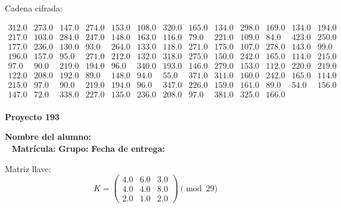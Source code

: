 \documentclass[12pt]{article}
\begin{document}
Cadena cifrada:
\begin{center}
$\begin{array}{lllllllllllll}
312.0 & 273.0 & 147.0 & 274.0 & 153.0 & 108.0 & 320.0 & 165.0 & 134.0 & 298.0 & 169.0 & 134.0 & 194.0\\
217.0 & 103.0 & 284.0 & 247.0 & 148.0 & 163.0 & 116.0 & 79.0 & 221.0 & 109.0 & 84.0 & 423.0 & 250.0\\
177.0 & 236.0 & 130.0 & 93.0 & 264.0 & 133.0 & 118.0 & 271.0 & 175.0 & 107.0 & 278.0 & 143.0 & 99.0\\
196.0 & 157.0 & 95.0 & 271.0 & 212.0 & 132.0 & 318.0 & 275.0 & 150.0 & 242.0 & 165.0 & 114.0 & 215.0\\
97.0 & 90.0 & 219.0 & 194.0 & 96.0 & 340.0 & 193.0 & 146.0 & 279.0 & 153.0 & 112.0 & 220.0 & 219.0\\
122.0 & 208.0 & 192.0 & 89.0 & 148.0 & 94.0 & 55.0 & 371.0 & 311.0 & 160.0 & 242.0 & 165.0 & 114.0\\
215.0 & 97.0 & 90.0 & 219.0 & 194.0 & 96.0 & 347.0 & 226.0 & 159.0 & 161.0 & 89.0 & 54.0 & 156.0\\
147.0 & 72.0 & 338.0 & 227.0 & 135.0 & 236.0 & 208.0 & 97.0 & 381.0 & 325.0 & 166.0\\
\end{array}$
\end{center}

\newpage


\textbf{Proyecto 193}

\textbf{Nombre del alumno:} \underline{\hspace{13cm}}\\\
\vspace{1cm}
\textbf{Matrícula:} \underline{\hspace{4cm}} \hspace{1cm}
\textbf{Grupo:} \underline{\hspace{2cm}}
\textbf{Fecha de entrega:} \underline{\hspace{2cm}}

\medskip

Matriz llave:
\[
K = \begin{pmatrix}
4.0 & 6.0 & 3.0\\
4.0 & 4.0 & 8.0\\
2.0 & 1.0 & 2.0
\end{pmatrix} \pmod{29}
\]
\end{document}
